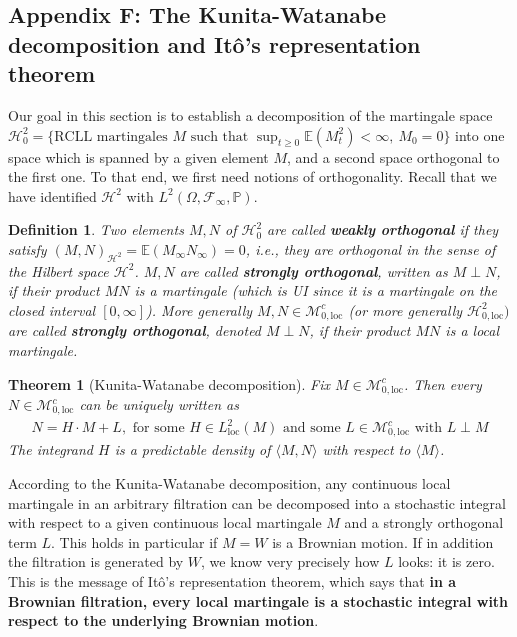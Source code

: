 \documentclass[12pt,a4paper, twoside]{article}
\newtheorem{thm}{Theorem}[section]
\newtheorem{defn}{Definition}[section]
\theoremstyle{definition}
\newcommand{\EE}{\mathbb{E}} %
\newcommand{\PP}{\mathbb{P}} %
\begin{document}
\subsection{Appendix F: The Kunita-Watanabe decomposition and Itô's representation theorem}
Our goal in this section is to establish a decomposition of the martingale space $\mathcal{H}_0^2= \{\text{RCLL martingales $M$ such that } \sup_{t \geq 0} \EE(M_t^2) < \infty, \ M_0=0\}$ into one space which is spanned by a given element $M$, and a second space orthogonal to the first one. To that end, we first need notions of orthogonality. Recall that we have identified $\mathcal{H}^2$ with $L^2( \Omega, \mathcal{F}_\infty, \PP)$. 
\begin{defn} Two elements $M,N $ of $\mathcal{H}_0^2$ are called \textbf{weakly orthogonal} if they satisfy $(M,N)_{\mathcal{H}^2} = \EE(M_\infty N_\infty)=0$, i.e., they are orthogonal in the sense of the Hilbert space $\mathcal{H}^2$. $M,N$ are called \textbf{strongly orthogonal}, written as $M \perp N$, if their product $MN$ is a martingale (which is UI since it is a martingale on the closed interval $[0, \infty]$). More generally $M,N \in \mathcal{M}_{0, \text{loc}}^c$ (or more generally $\mathcal{H}_{0, \text{loc}}^2)$ are called \textbf{strongly orthogonal}, denoted $M \perp N$,  if their product $MN$ is a local martingale.  
\end{defn}
\begin{thm}[Kunita-Watanabe decomposition] Fix $M \in \mathcal{M}_{0, \text{loc}}^c$. Then every $N \in \mathcal{M}_{0, \text{loc}}^c$ can be uniquely written as
\begin{align*}
N= H \cdot M + L, \text{ for some $H \in L_\text{loc}^2(M)$ and some $L \in \mathcal{M}_{0, \text{loc}}^c$ with $L \perp M$}
\end{align*}
The integrand $H$ is a predictable density of $\langle M, N \rangle$ with respect to $\langle M \rangle$. 
\end{thm}
According to the Kunita-Watanabe decomposition, any continuous local martingale in an arbitrary filtration can be decomposed into a stochastic integral with respect to a given continuous local martingale $M$ and a strongly orthogonal term $L$. This holds in particular if $M=W$ is a Brownian motion. If in addition the filtration is generated by $W$, we know very precisely how $L$ looks: it is zero. This is the message of Itô's representation theorem, which says that \textbf{in a Brownian filtration, every local martingale is a stochastic integral with respect to the underlying Brownian motion}.
\end{document}
